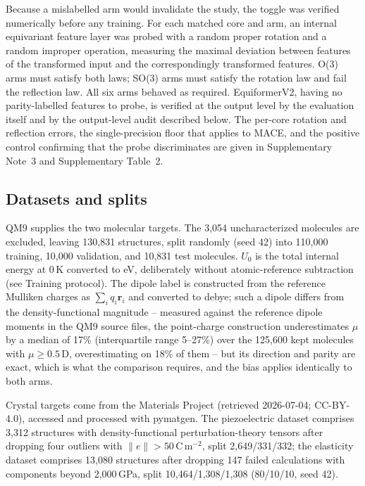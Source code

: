 Because a mislabelled arm would invalidate the study, the toggle was verified numerically before any training. For each matched core and arm, an internal equivariant feature layer was probed with a random proper rotation and a random improper operation, measuring the maximal deviation between features of the transformed input and the correspondingly transformed features. O(3) arms must satisfy both laws; SO(3) arms must satisfy the rotation law and fail the reflection law. All six arms behaved as required. EquiformerV2, having no parity-labelled features to probe, is verified at the output level by the evaluation itself and by the output-level audit described below. The per-core rotation and reflection errors, the single-precision floor that applies to MACE, and the positive control confirming that the probe discriminates are given in Supplementary Note~3 and Supplementary Table~2.

\subsection*{Datasets and splits}

QM9\cite{ramakrishnan2014qm9} supplies the two molecular targets. The 3,054 uncharacterized molecules are excluded, leaving 130,831 structures, split randomly (seed 42) into 110,000 training, 10,000 validation, and 10,831 test molecules. $U_0$ is the total internal energy at 0\,K converted to eV, deliberately without atomic-reference subtraction (see Training protocol). The dipole label is constructed from the reference Mulliken charges as $\sum_i q_i \mathbf{r}_i$ and converted to debye; such a dipole differs from the density-functional magnitude -- measured against the reference dipole moments in the QM9 source files, the point-charge construction underestimates $\mu$ by a median of 17\% (interquartile range 5--27\%) over the 125,600 kept molecules with $\mu \geq 0.5$\,D, overestimating on 18\% of them -- but its direction and parity are exact, which is what the comparison requires, and the bias applies identically to both arms.

Crystal targets come from the Materials Project (retrieved 2026-07-04; CC-BY-4.0), accessed and processed with pymatgen\cite{ong2013pymatgen}. The piezoelectric dataset\cite{dejong2015piezo} comprises 3,312 structures with density-functional perturbation-theory tensors after dropping four outliers with $\lVert e \rVert > 50$\,C\,m$^{-2}$, split 2,649/331/332; the elasticity dataset comprises 13,080 structures after dropping 147 failed calculations with components beyond 2,000\,GPa, split 10,464/1,308/1,308 (80/10/10, seed 42).

